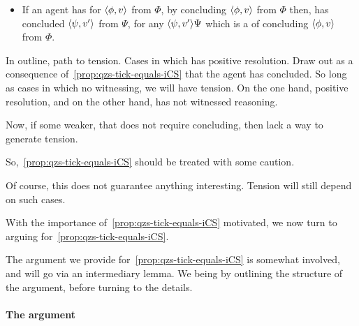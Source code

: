 \begin{note}
  \begin{itemize}
  \item
    If an agent has \csVed{} for \(\langle \phi, v \rangle\) from \(\Phi\), by concluding \(\langle \phi, v \rangle\) from \(\Phi\) then, has concluded \(\langle \psi, v' \rangle\) from \(\Psi\), for any \(\langle \psi, v' \rangle{\Psi}\) which is a \requ{} of concluding \(\langle \phi, v \rangle\) from \(\Phi\).
  \end{itemize}

  In outline, path to tension.
  Cases in which \qzs{} has positive resolution.
  Draw out as a consequence of~\autoref{prop:qzs-tick-equals-iCS} that the agent has concluded.
  So long as cases in which no witnessing, we will have tension.
  On the one hand, positive resolution, and on the other hand, has not witnessed reasoning.

  Now, if some weaker, that does not require concluding, then lack a way to generate tension.

  So,~\autoref{prop:qzs-tick-equals-iCS} should be treated with some caution.

  Of course, this does not guarantee anything interesting.
  Tension will still depend on such cases.
\end{note}

\begin{note}
  With the importance of~\autoref{prop:qzs-tick-equals-iCS} motivated, we now turn to arguing for~\autoref{prop:qzs-tick-equals-iCS}.

  The argument we provide for~\autoref{prop:qzs-tick-equals-iCS} is somewhat involved, and will go via an intermediary lemma.
  We being by outlining the structure of the argument, before turning to the details.
\end{note}

\paragraph*{The argument}

